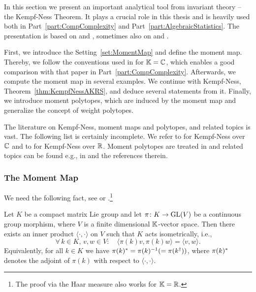 In this section we present an important analytical tool from invariant theory -- the Kempf-Ness Theorem. It plays a crucial role in this thesis and is heavily used both in Part~\ref{part:CompComplexity} and Part~\ref{part:AlgebraicStatistics}. The presentation is based on \cite{GradflowArXiv} and \cite{WeightMargin}, sometimes also on \cite{SiagaPaper} and \cite[Appendix~B]{DiscretePaper}.

First, we introduce the Setting~\ref{set:MomentMap} and define the moment map. Thereby, we follow the conventions used in \cite{GradflowArXiv} for $\mathbb K=\mathbb C$, which enables a good comparison with that paper in Part~\ref{part:CompComplexity}.
Afterwards, we compute the moment map in several examples. We continue with Kempf-Ness, Theorem~\ref{thm:KempfNessAKRS}, and deduce several statements from it. Finally, we introduce moment polytopes, which are induced by the moment map and generalize the concept of weight polytopes.

The literature on Kempf-Ness, moment maps and polytopes, and related topics is vast. The following list is certainly incomplete. We refer to \cite{KempfNess, MumfordGITbook, Wallach} for Kempf-Ness over $\mathbb C$ and to \cite{RichardsonSlodowy, biliotti2021RealKempfNess, RealGIT, Wallach} for Kempf-Ness over $\mathbb R$. Moment polytopes are treated in \cite{brion1987sur, GuilleminSternberg, kirwan1984convexity, osheaSjamaar2000moment, paradan2020moment} and related topics can be found e.g., in 
\cite{heinzner2007cartan, heinzner2008stratifications, KirwanBook, MumfordGITbook, marian2001on, NessStratification, thomas2006notes} and the references therein.



\subsubsection{The Moment Map}


We need the following fact, see \cite[Proposition~4.6]{KnappBook} or \cite[Theorem~2.9]{Wallach}.\footnote{The proof via the Haar measure also works for $\mathbb K = \mathbb R$.}

\begin{lemma} \label{lem:KinvariantInnerProduct}
	Let $K$ be a compact matrix Lie group and let $\pi \colon K \to \operatorname{GL}(V)$ be a continuous group morphism, where $V$ is a finite dimensional $\mathbb K$-vector space. Then there exists an inner product $\langle \cdot, \cdot \rangle$ on $V$ such that $K$ acts isometrically, i.e.,
		\[ \forall \,  k \in K, \, v,w \in V \colon \quad  \langle \pi(k)v, \pi(k)w \rangle = \langle v, w \rangle . \]
	Equivalently, for all $k \in K$ we have $\pi(k)^{\ast} = \pi(k)^{-1} (= \pi(k^{\dagger}))$, where $\pi(k)^{\ast}$ denotes the adjoint of $\pi(k)$ with respect to $\langle \cdot, \cdot \rangle$.
\end{lemma}

